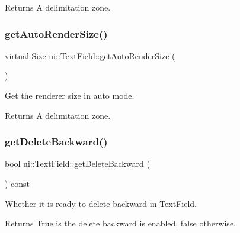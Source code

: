 \begin{DoxyReturn}{Returns}
A delimitation zone. 
\end{DoxyReturn}
\mbox{\label{classui_1_1TextField_a8f29bc576be33084471fb5b9bb169f5b}} 
\subsubsection{\texorpdfstring{get\+Auto\+Render\+Size()}{getAutoRenderSize()}\hspace{0.1cm}{\footnotesize\ttfamily [2/2]}}
{\footnotesize\ttfamily virtual \hyperlink{classSize}{Size} ui\+::\+Text\+Field\+::get\+Auto\+Render\+Size (\begin{DoxyParamCaption}{ }\end{DoxyParamCaption})\hspace{0.3cm}{\ttfamily [virtual]}}



Get the renderer size in auto mode. 

\begin{DoxyReturn}{Returns}
A delimitation zone. 
\end{DoxyReturn}
\mbox{\label{classui_1_1TextField_ace67fc7cdbc68d981ab918e86d0d462c}} 
\subsubsection{\texorpdfstring{get\+Delete\+Backward()}{getDeleteBackward()}\hspace{0.1cm}{\footnotesize\ttfamily [1/2]}}
{\footnotesize\ttfamily bool ui\+::\+Text\+Field\+::get\+Delete\+Backward (\begin{DoxyParamCaption}{ }\end{DoxyParamCaption}) const}



Whether it is ready to delete backward in \hyperlink{classui_1_1TextField}{Text\+Field}. 

\begin{DoxyReturn}{Returns}
True is the delete backward is enabled, false otherwise. 
\end{DoxyReturn}
\mbox{\label{classui_1_1TextField_ace67fc7cdbc68d981ab918e86d0d462c}} 

